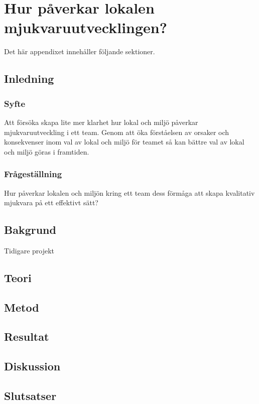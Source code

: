 \chapter{Hur påverkar lokalen mjukvaruutvecklingen?}
\label{cha:indiv-report-person}

Det här appendixet innehåller följande sektioner.

\section{Inledning}
\label{sec:introduction-person}


\subsection{Syfte}
\label{sec:purpose-person}

Att försöka skapa lite mer klarhet hur lokal och miljö påverkar mjukvaruutveckling i ett team. Genom att öka förståelsen av orsaker och konsekvenser inom val av lokal och miljö för teamet så kan bättre val av lokal och miljö göras i framtiden.

\subsection{Frågeställning}
\label{sec:issue-person}

Hur påverkar lokalen och miljön kring ett team dess förmåga att skapa kvalitativ mjukvara på ett effektivt sätt?

\section{Bakgrund}
\label{sec:background-person}

Tidigare projekt

\section{Teori}
\label{sec:theory-person}


\section{Metod}
\label{sec:method-person}


\section{Resultat}
\label{sec:results-person}


\section{Diskussion}
\label{sec:discussion-person}


\section{Slutsatser}
\label{sec:conclusions-person}


